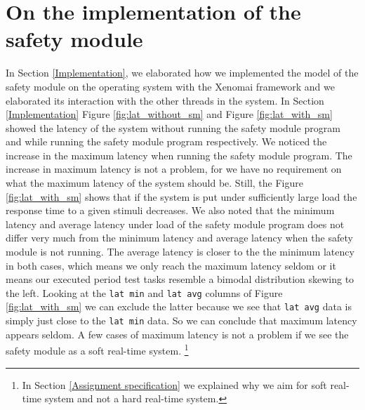 \documentclass[12pt]{scrreprt}
\begin{document}
\section{On the implementation of the safety module}
\label{On the implementation of the safety module}
In Section \ref{Implementation}, we elaborated how we implemented the model of the safety module on the operating system with the Xenomai framework and we elaborated its interaction with the other threads in the system. In Section \ref{Implementation} Figure \ref{fig:lat_without_sm} and Figure \ref{fig:lat_with_sm} showed the latency of the system without running the safety module program and while running the safety module program respectively. We noticed the increase in the maximum latency when running the safety module program. The increase in maximum latency is not a problem, for we have no requirement on what the maximum latency of the system should be. Still, the Figure \ref{fig:lat_with_sm} shows that if the system is put under sufficiently large load the response time to a given stimuli decreases. We also noted that the minimum latency and average latency under load of the safety module program does not differ very much from the minimum latency and average latency when the safety module is not running. The average latency is closer to the the minimum latency in both cases, which means we only reach the maximum latency seldom or it means our executed period test tasks resemble a bimodal distribution skewing to the left. Looking at the \texttt{lat min} and \texttt{lat avg} columns of Figure \ref{fig:lat_with_sm} we can exclude the latter because we see that \texttt{lat avg} data is simply just close to the \texttt{lat min} data. So we can conclude that maximum latency appears seldom. A few cases of maximum latency is not a problem if we see the safety module as a soft real-time system. \footnote{In Section \ref{Assignment specification} we explained why we aim for soft real-time system and not a hard real-time system.}
\par
\end{document}
